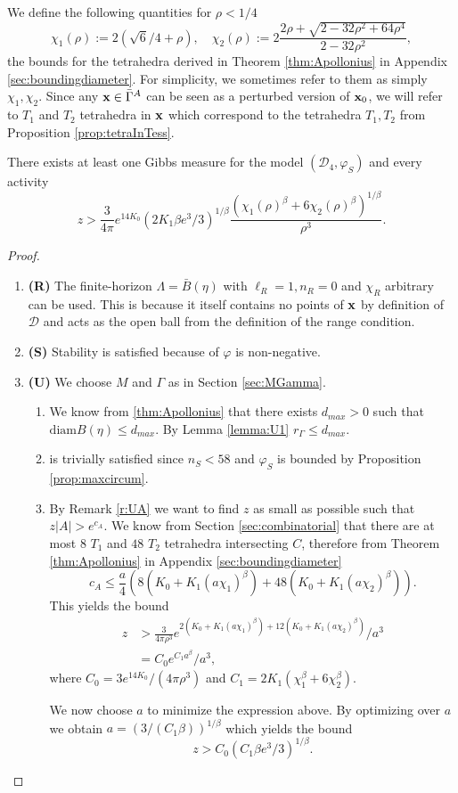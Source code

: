 \noindent We define the following quantities for $\rho<1/4$
$$\chi_1(\rho) := 2(\sqrt 6/4 + \rho),\quad \chi_2(\rho) := 2 \frac{2\rho + \sqrt{2 - 32\rho^2 + 64 \rho^4}}{2-32\rho^2},$$
the bounds for the tetrahedra derived in Theorem \ref{thm:Apollonius} in Appendix \ref{sec:boundingdiameter}. For simplicity, we sometimes refer to them as simply $\chi_1,\chi_2$. Since any ${\mathbf{x}} \in \bar\Gamma^A$ can be seen as a perturbed version of ${\mathbf{x}}_0$, we will refer to $T_1$ and $T_2$ tetrahedra in ${\mathbf{x}}$ which correspond to the tetrahedra $T_1,T_2$ from Proposition \ref{prop:tetraInTess}.

\begin{theorem}\label{thm:E1}
	There exists at least one Gibbs measure for the model $(\mathcal D_4,\varphi_S)$ and every activity 
	$$z> \frac{3}{4\pi}e^{14 K_0}   (2K_1 \beta e^3/3)^{1/\beta} \frac{(\chi_1(\rho)^\beta + 6\chi_2(\rho)^\beta)^{1/\beta}}{\rho^3}.$$
\end{theorem}
\begin{proof}
\begin{enumerate}[]
	\item \textbf{(R)} The finite-horizon $\Lambda = \bar B(\eta)$ with $\ell_R = 1, n_R = 0$ and $\chi_R$ arbitrary can be used. This is because it itself contains no points of ${\mathbf{x}}$ by definition of $\mathcal D$ and acts as the open ball from the definition of the range condition.
	\item \textbf{(S)} Stability is satisfied because of $\varphi$ is non-negative.
	\item \textbf{(U)} We choose $M$ and $\Gamma$ as in Section \ref{sec:MGamma}.
		\begin{enumerate}[(U1)]
			\item We know from \ref{thm:Apollonius} that there exists $d_{max}>0$ such that $\text{diam}B(\eta)\leq d_{max}$. By Lemma \ref{lemma:U1} $r_\Gamma\leq d_{max}.$
			\item is trivially satisfied since $n_S < 58$ and $\varphi_S$ is bounded by Proposition \ref{prop:maxcircum}.
			\item By Remark \ref{r:UA} we want to find $z$ as small as possible such that $z|A|>e^{c_A}.$ We know from Section \ref{sec:combinatorial} that there are at most $8$ $T_1$ and $48$ $T_2$ tetrahedra intersecting $C$, therefore from Theorem \ref{thm:Apollonius} in Appendix \ref{sec:boundingdiameter}
				$$c_A \leq \frac a4 (8( K_0 + K_1 (a\chi_1)^\beta) + 48( K_0 + K_1 (a\chi_2)^\beta) ).$$
				This yields the bound
				\begin{align*}z &> \frac{3} {4\pi\rho^3}e^{2(K_0 + K_1 (a\chi_1)^\beta) + 12(K_0 + K_1(a \chi_2)^\beta)} / a^3  \\
					&= C_0 e^{C_1 a^\beta} / a^3,  
				\end{align*}
				where $C_0 = 3e^{14K_0}/(4\pi \rho^3)$ and $C_1 = 2K_1(\chi_1^\beta + 6 \chi_2^\beta)$.

				We now choose $a$ to minimize the expression above. By optimizing over $a$ we obtain $a=(3/(C_1 \beta))^{1/\beta}$ which yields the bound 
				$$z> C_0(C_1 \beta e^3/ 3 )^{1/\beta}.$$
		\end{enumerate}
\end{enumerate}
\end{proof}

